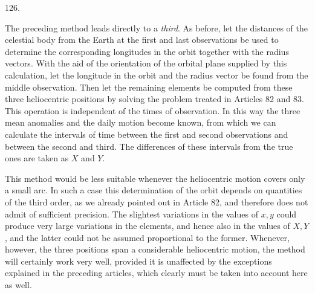 \par{}\medskip
\begin{center}\hypertarget{native-173-article126}{}126.\end{center}
The preceding method leads directly to a \emph{third}. As before, let the distances of the celestial body from the Earth at the first and last observations be used to determine the corresponding longitudes in the orbit together with the radius vectors. With the aid of the orientation of the orbital plane supplied by this calculation, let the longitude in the orbit and the radius vector be found from the middle observation. Then let the remaining elements be computed from these three heliocentric positions by solving the problem treated in Articles 82 and 83. This operation is independent of the times of observation. In this way the three mean anomalies and the daily motion become known, from which we can calculate the intervals of time between the first and second observations and between the second and third. The differences of these intervals from the true ones are taken as $X$ and $Y$.

This method would be less suitable whenever the heliocentric motion covers only a small arc. In such a case this determination of the orbit depends on quantities of the third order, as we already pointed out in Article 82, and therefore does not admit of sufficient precision. The slightest variations in the values of $x,y$ could produce very large variations in the elements, and hence also in the values of $X,Y$, and the latter could not be assumed proportional to the former. Whenever, however, the three positions span a considerable heliocentric motion, the method will certainly work very well, provided it is unaffected by the exceptions explained in the preceding articles, which clearly must be taken into account here as well.

